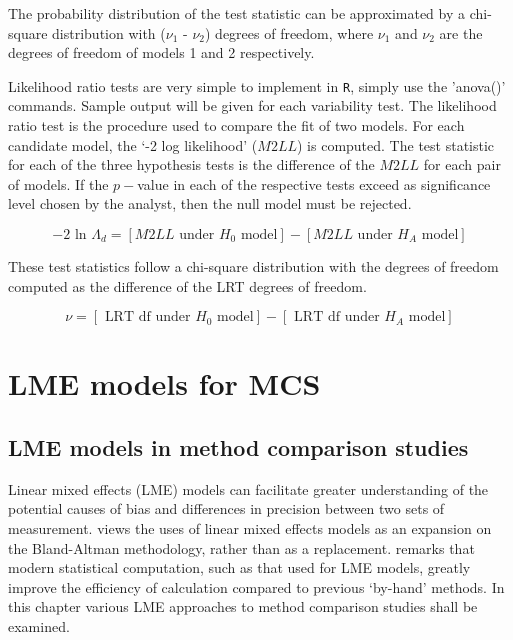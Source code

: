 \documentclass[12pt, a4paper]{report}
\theoremstyle{plain}
\theoremstyle{definition}
\theoremstyle{remark}
\begin{document}
The probability distribution of the test statistic can be approximated by a chi-square distribution with ($\nu_1$ - $\nu_2$) degrees of freedom, where $\nu_1$ and $\nu_2$ are the degrees of freedom of models 1 and 2 respectively.

Likelihood ratio tests are very simple to implement in \texttt{R}, simply use the 'anova()' commands. Sample output will be given for each variability test.
The likelihood ratio test is the procedure used to compare the fit of two models. For each candidate model, the `-2 log likelihood' ($M2LL$) is computed. The test statistic for each of the three hypothesis tests is the difference of the $M2LL$ for each pair of models. If the $p-$value in each of the respective tests exceed as significance level chosen by the analyst, then the null model must be rejected.

\begin{equation}
-2\mbox{ ln }\Lambda_{d} =  [ M2LL \mbox{ under }H_{0} \mbox{ model}] - [ M2LL \mbox{ under }H_{A} \mbox{ model}]
\end{equation}

These test statistics follow a chi-square distribution with the degrees of freedom computed as the difference of the LRT degrees of freedom.

\begin{equation}
\nu = [\mbox{ LRT df under }H_{0} \mbox{ model}] - [\mbox{ LRT df under }H_{A} \mbox{ model}]
\end{equation}







\chapter{LME models for MCS}
\section{LME models in method comparison studies}

Linear mixed effects (LME) models can facilitate greater
understanding of the potential causes of bias and differences in
precision between two sets of measurement. \citet{LaiShiao} views
the uses of linear mixed effects models as an expansion on the
Bland-Altman methodology, rather than as a replacement.
\citet{BXC2008} remarks that modern statistical computation, such
as that used for LME models, greatly improve the efficiency of
calculation compared to previous `by-hand' methods. In this
chapter various LME approaches to method comparison studies shall
be examined.
\end{document}
